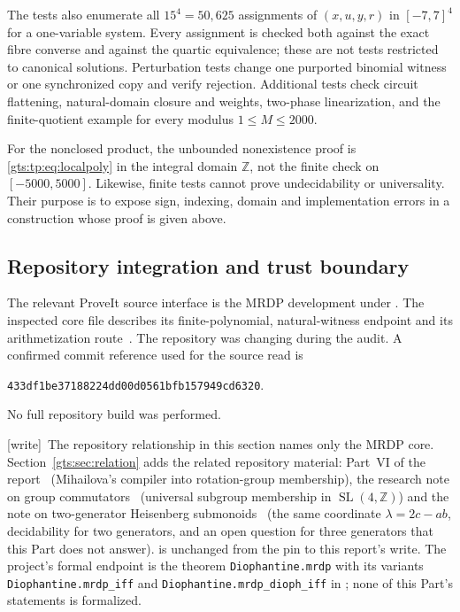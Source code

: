 \documentclass[11pt,letterpaper]{article}
\theoremstyle{definition}
\theoremstyle{remark}
\newcommand{\SL}{\operatorname{SL}}
\newcommand{\ZZ}{\mathbb Z}
\newcommand{\wtag}{\textup{[write]}}
\begin{document}
The tests also enumerate all $15^4=50{,}625$ assignments of $(x,u,y,r)$ in
$[-7,7]^4$ for a one-variable system. Every assignment is checked both
against the exact fibre converse and against the quartic equivalence;
these are not tests restricted to canonical solutions. Perturbation tests
change one purported binomial witness or one synchronized copy and verify
rejection. Additional tests check circuit flattening, natural-domain
closure and weights, two-phase linearization, and the finite-quotient
example for every modulus $1\leq M\leq2000$.

For the nonclosed product, the unbounded nonexistence proof is
\eqref{gts:tp:eq:localpoly} in the integral domain $\ZZ$, not the finite check on
$[-5000,5000]$. Likewise, finite tests cannot prove undecidability or
universality. Their purpose is to expose sign, indexing, domain and
implementation errors in a construction whose proof is given above.

\subsection{Repository integration and trust boundary}
The relevant ProveIt source interface is the MRDP development under
.
The inspected core file describes its finite-polynomial, natural-witness
endpoint and its arithmetization route~\cite{ProveIt}. The repository was
changing during the audit. A confirmed commit reference used for the
source read is
\begin{center}\small\texttt{433df1be37188224dd00d0561bfb157949cd6320}.\end{center}
No full repository build was performed.

\wtag\ The repository relationship in this section names only the MRDP core. Section~\ref{gts:sec:relation} adds the related repository material: Part~VI of the report~\cite{pqc} (Mihailova's compiler into rotation-group membership), the research note on group commutators~\cite{repo-comm} (universal subgroup membership in $\SL(4,\ZZ)$) and the note on two-generator Heisenberg submonoids~\cite{repo-heis} (the same coordinate $\lambda=2c-ab$, decidability for two generators, and an open question for three generators that this Part does not answer).  is unchanged from the pin to this report's write. The project's formal endpoint is the theorem \texttt{Diophantine.mrdp} with its variants \texttt{Diophantine.mrdp\_iff} and \texttt{Diophantine.mrdp\_dioph\_iff} in ; none of this Part's statements is formalized.
\end{document}
